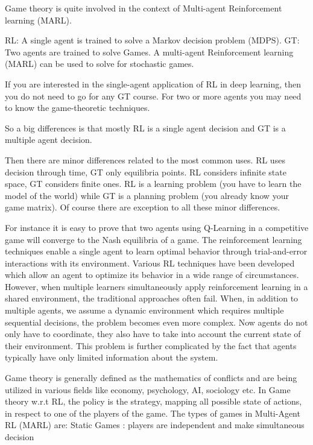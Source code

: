 \documentclass[conference]{IEEEtran}
\begin{document}
\begin{enumerate}
Game theory is quite involved in the context of Multi-agent Reinforcement learning (MARL).

RL: A single agent is trained to solve a Markov decision problem (MDPS). GT: Two agents are trained to solve Games. A multi-agent Reinforcement learning (MARL) can be used to solve for stochastic games.

If you are interested in the single-agent application of RL in deep learning, then you do not need to go for any GT course. For two or more agents you may need to know the game-theoretic techniques.

So a big differences is that mostly RL is a single agent decision and GT is a multiple agent decision.

Then there are minor differences related to the most common uses. RL uses decision through time, GT only equilibria points. RL considers infinite state space, GT considers finite ones. RL is a learning problem (you have to learn the model of the world) while GT is a planning problem (you already know your game matrix). Of course there are exception to all these minor differences.

For instance it is easy to prove that two agents using Q-Learning in a competitive game will converge to the Nash equilibria of a game.
The reinforcement learning techniques enable a single
agent to learn optimal behavior through trial-and-error interactions with its environment. Various RL techniques have been developed which allow an agent to optimize its behavior in a wide range of circumstances. However, when multiple learners simultaneously apply reinforcement learning in a shared environment, the traditional
approaches often fail.
When, in addition to multiple agents, we assume a dynamic environment which
requires multiple sequential decisions, the problem becomes even more complex.
Now agents do not only have to coordinate, they also have to take into account the
current state of their environment. This problem is further complicated by the fact
that agents typically have only limited information about the system.

Game theory is generally defined as the mathematics of conflicts and are being utilized in various fields like economy, psychology, AI, sociology etc. In Game theory w.r.t RL, the policy is the strategy, mapping all possible state of actions, in respect to one of the players of the game.
The types of games in Multi-Agent RL (MARL) are:
Static Games : players are independent and make simultaneous decision


\end{enumerate}
\end{document}
